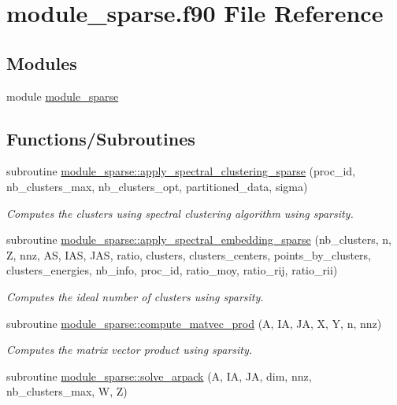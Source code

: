 \hypertarget{module__sparse_8f90}{}\section{module\+\_\+sparse.\+f90 File Reference}
\label{module__sparse_8f90}
\subsection*{Modules}
\begin{DoxyCompactItemize}
\item 
module \hyperlink{namespacemodule__sparse}{module\+\_\+sparse}
\end{DoxyCompactItemize}
\subsection*{Functions/\+Subroutines}
\begin{DoxyCompactItemize}
\item 
subroutine \hyperlink{namespacemodule__sparse_ac7a222921bd378c5d9d8d41fa05423ad}{module\+\_\+sparse\+::apply\+\_\+spectral\+\_\+clustering\+\_\+sparse} (proc\+\_\+id, nb\+\_\+clusters\+\_\+max, nb\+\_\+clusters\+\_\+opt, partitioned\+\_\+data, sigma)
\begin{DoxyCompactList}\small\item\em Computes the clusters using spectral clustering algorithm using sparsity. \end{DoxyCompactList}\item 
subroutine \hyperlink{namespacemodule__sparse_a6fc2f45f94f4ea124ea27f88b8823274}{module\+\_\+sparse\+::apply\+\_\+spectral\+\_\+embedding\+\_\+sparse} (nb\+\_\+clusters, n, Z, nnz, A\+S, I\+A\+S, J\+A\+S, ratio, clusters, clusters\+\_\+centers, points\+\_\+by\+\_\+clusters, clusters\+\_\+energies, nb\+\_\+info, proc\+\_\+id, ratio\+\_\+moy, ratio\+\_\+rij, ratio\+\_\+rii)
\begin{DoxyCompactList}\small\item\em Computes the ideal number of clusters using sparsity. \end{DoxyCompactList}\item 
subroutine \hyperlink{namespacemodule__sparse_a172821d54ec6f3bec6f07ca4f9d96d37}{module\+\_\+sparse\+::compute\+\_\+matvec\+\_\+prod} (A, I\+A, J\+A, X, Y, n, nnz)
\begin{DoxyCompactList}\small\item\em Computes the matrix vector product using sparsity. \end{DoxyCompactList}\item 
subroutine \hyperlink{namespacemodule__sparse_a1945ecdb844a637fd6372b3686b4df40}{module\+\_\+sparse\+::solve\+\_\+arpack} (A, I\+A, J\+A, dim, nnz, nb\+\_\+clusters\+\_\+max, W, Z)
\end{DoxyCompactItemize}
